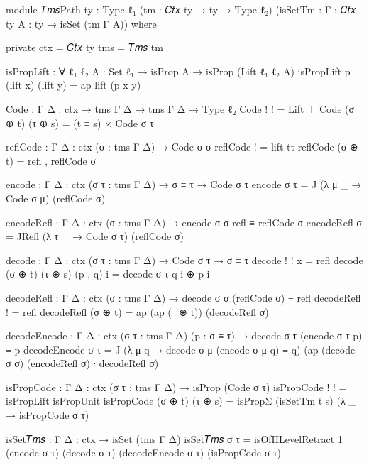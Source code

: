 \begin{code}[hide]
module 𝑇𝑚𝑠Path {ty : Type ℓ₁} (tm : 𝐶𝑡𝑥 ty → ty → Type ℓ₂)
       (isSetTm : {Γ : 𝐶𝑡𝑥 ty} {A : ty} → isSet (tm Γ A)) where

  private
    ctx = 𝐶𝑡𝑥 ty
    tms = 𝑇𝑚𝑠 tm

  isPropLift : ∀ {ℓ₁ ℓ₂} {A : Set ℓ₁} → isProp A → isProp (Lift {ℓ₁} {ℓ₂} A)
  isPropLift p (lift x) (lift y) = ap lift (p x y)

  Code : {Γ Δ : ctx} → tms Γ Δ → tms Γ Δ → Type ℓ₂
  Code ! ! = Lift ⊤
  Code (σ ⊕ t) (τ ⊕ s) = (t ≡ s) × Code σ τ

  reflCode : {Γ Δ : ctx} (σ : tms Γ Δ) → Code σ σ
  reflCode ! = lift tt
  reflCode (σ ⊕ t) = refl , reflCode σ

  encode : {Γ Δ : ctx} (σ τ : tms Γ Δ) → σ ≡ τ → Code σ τ
  encode σ τ = J (λ μ _ → Code σ μ) (reflCode σ)

  encodeRefl : {Γ Δ : ctx} (σ : tms Γ Δ) → encode σ σ refl ≡ reflCode σ
  encodeRefl σ = JRefl (λ τ _ → Code σ τ) (reflCode σ)

  decode : {Γ Δ : ctx} (σ τ : tms Γ Δ) → Code σ τ → σ ≡ τ
  decode ! ! x = refl
  decode (σ ⊕ t) (τ ⊕ s) (p , q) i = decode σ τ q i ⊕ p i

  decodeRefl : {Γ Δ : ctx} (σ : tms Γ Δ) → decode σ σ (reflCode σ) ≡ refl
  decodeRefl ! = refl
  decodeRefl (σ ⊕ t) = ap (ap (_⊕ t)) (decodeRefl σ)

  decodeEncode : {Γ Δ : ctx} (σ τ : tms Γ Δ) (p : σ ≡ τ) → decode σ τ (encode σ τ p) ≡ p
  decodeEncode σ τ =
    J (λ μ q → decode σ μ (encode σ μ q) ≡ q)
      (ap (decode σ σ) (encodeRefl σ) ∙ decodeRefl σ)

  isPropCode : {Γ Δ : ctx} (σ τ : tms Γ Δ) → isProp (Code σ τ)
  isPropCode ! ! = isPropLift isPropUnit
  isPropCode (σ ⊕ t) (τ ⊕ s) = isPropΣ (isSetTm t s) (λ _ → isPropCode σ τ)

  isSet𝑇𝑚𝑠 : {Γ Δ : ctx} → isSet (tms Γ Δ)
  isSet𝑇𝑚𝑠 σ τ =
    isOfHLevelRetract 1
      (encode σ τ)
      (decode σ τ)
      (decodeEncode σ τ)
      (isPropCode σ τ)

\end{code}

